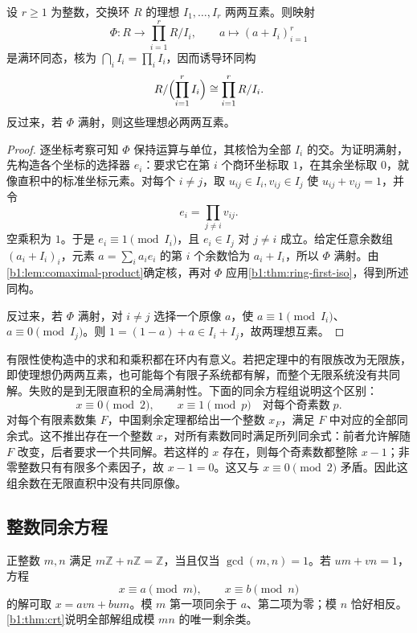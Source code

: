 \begin{theorem}[中国剩余定理]\label{b1:thm:crt}
	设 \(r\geq1\) 为整数，交换环 \(R\) 的理想 \(I_1,\ldots,I_r\) 两两互素。则映射
	\[
		\Phi:R\longrightarrow\prod_{i=1}^rR/I_i,\qquad a\longmapsto(a+I_i)_{i=1}^r
	\]
	是满环同态，核为 \(\bigcap_iI_i=\prod_iI_i\)，因而诱导环同构
	\[
		R/\Bigl(\prod_{i=1}^rI_i\Bigr)\cong\prod_{i=1}^rR/I_i.
	\]
	反过来，若 \(\Phi\) 满射，则这些理想必两两互素。
\end{theorem}
\begin{proof}
	逐坐标考察可知 \(\Phi\) 保持运算与单位，其核恰为全部 \(I_i\) 的交。为证明满射，先构造各个坐标的选择器 \(e_i\)：要求它在第 \(i\) 个商环坐标取 \(1\)，在其余坐标取 \(0\)，就像直积中的标准坐标元素。对每个 \(i\ne j\)，取 \(u_{ij}\in I_i,v_{ij}\in I_j\) 使 \(u_{ij}+v_{ij}=1\)，并令
	\[
		e_i=\prod_{j\ne i}v_{ij}.
	\]
	空乘积为 \(1\)。于是 \(e_i\equiv1\pmod{I_i}\)，且 \(e_i\in I_j\) 对 \(j\ne i\) 成立。给定任意余数组 \((a_i+I_i)_i\)，元素 \(a=\sum_i a_ie_i\) 的第 \(i\) 个余数恰为 \(a_i+I_i\)，所以 \(\Phi\) 满射。由\cref{b1:lem:comaximal-product}确定核，再对 \(\Phi\) 应用\cref{b1:thm:ring-first-iso}，得到所述同构。

	反过来，若 \(\Phi\) 满射，对 \(i\ne j\) 选择一个原像 \(a\)，使 \(a\equiv1\pmod{I_i}\)、\(a\equiv0\pmod{I_j}\)。则 \(1=(1-a)+a\in I_i+I_j\)，故两理想互素。
\end{proof}
有限性使构造中的求和和乘积都在环内有意义。若把定理中的有限族改为无限族，即使理想仍两两互素，也可能每个有限子系统都有解，而整个无限系统没有共同解。失败的是到无限直积的全局满射性。下面的同余方程组说明这个区别：
\[
	x\equiv0\pmod2,\qquad x\equiv1\pmod p\quad\text{对每个奇素数}\;p.
\]
对每个有限素数集 \(F\)，中国剩余定理都给出一个整数 \(x_F\)，满足 \(F\) 中对应的全部同余式。这不推出存在一个整数 \(x\)，对所有素数同时满足所列同余式：前者允许解随 \(F\) 改变，后者要求一个共同解。若这样的 \(x\) 存在，则每个奇素数都整除 \(x-1\)；非零整数只有有限多个素因子，故 \(x-1=0\)。这又与 \(x\equiv0\pmod2\) 矛盾。因此这组余数在无限直积中没有共同原像。

\subsection{整数同余方程}
\label{b1:subsec:1004:02}
正整数 \(m,n\) 满足 \(m\mathbb Z+n\mathbb Z=\mathbb Z\)，当且仅当 \(\gcd(m,n)=1\)。若 \(um+vn=1\)，方程
\[
	x\equiv a\pmod m,\qquad x\equiv b\pmod n
\]
的解可取 \(x=avn+bum\)。模 \(m\) 第一项同余于 \(a\)、第二项为零；模 \(n\) 恰好相反。\cref{b1:thm:crt}说明全部解组成模 \(mn\) 的唯一剩余类。

